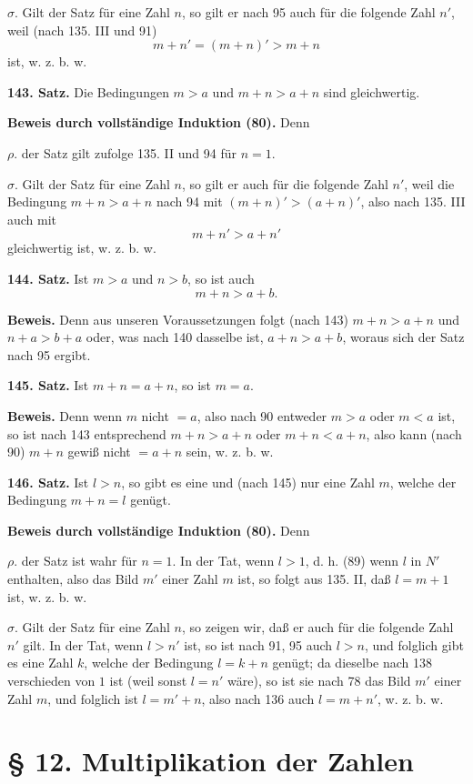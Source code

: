 \documentclass[11pt]{article}
\begin{document}
\noindent $\sigma.$ Gilt der Satz für eine Zahl $n$, so gilt er nach 95 auch für die folgende Zahl $n'$, weil (nach 135. III und 91)
\[
m+n'=(m+n)'>m+n
\]
ist, w. z. b. w.

\noindent\textbf{143. Satz.} Die Bedingungen $m>a$ und $m+n>a+n$ sind gleichwertig.

\noindent\textbf{Beweis durch vollständige Induktion (80).} Denn

\noindent $\rho.$ der Satz gilt zufolge 135. II und 94 für $n=1$.

\noindent $\sigma.$ Gilt der Satz für eine Zahl $n$, so gilt er auch für die folgende Zahl $n'$, weil die Bedingung $m+n>a+n$ nach 94 mit $(m+n)'>(a+n)'$, also nach 135. III auch mit
\[
m+n'>a+n'
\]
gleichwertig ist, w. z. b. w.

\noindent\textbf{144. Satz.} Ist $m>a$ und $n>b$, so ist auch
\[
m+n>a+b.
\]

\noindent\textbf{Beweis.} Denn aus unseren Voraussetzungen folgt (nach 143) $m+n>a+n$ und $n+a>b+a$ oder, was nach 140 dasselbe ist, $a+n>a+b$, woraus sich der Satz nach 95 ergibt.

\noindent\textbf{145. Satz.} Ist $m+n=a+n$, so ist $m=a$.

\noindent\textbf{Beweis.} Denn wenn $m$ nicht $=a$, also nach 90 entweder $m>a$ oder $m<a$ ist, so ist nach 143 entsprechend $m+n>a+n$ oder $m+n<a+n$, also kann (nach 90) $m+n$ gewiß nicht $=a+n$ sein, w. z. b. w.

\noindent\textbf{146. Satz.} Ist $l>n$, so gibt es eine und (nach 145) nur eine Zahl $m$, welche der Bedingung $m+n=l$ genügt.

\noindent\textbf{Beweis durch vollständige Induktion (80).} Denn

\noindent $\rho.$ der Satz ist wahr für $n=1$. In der Tat, wenn $l>1$, d. h. (89) wenn $l$ in $N'$ enthalten, also das Bild $m'$ einer Zahl $m$ ist, so folgt aus 135. II, daß $l=m+1$ ist, w. z. b. w.

\noindent $\sigma.$ Gilt der Satz für eine Zahl $n$, so zeigen wir, daß er auch für die folgende Zahl $n'$ gilt. In der Tat, wenn $l>n'$ ist, so ist nach 91, 95 auch $l>n$, und folglich gibt es eine Zahl $k$, welche der Bedingung $l=k+n$ genügt; da dieselbe nach 138 verschieden von $1$ ist (weil sonst $l=n'$ wäre), so ist sie nach 78 das Bild $m'$ einer Zahl $m$, und folglich ist $l=m'+n$, also nach 136 auch $l=m+n'$, w. z. b. w.

\section*{\S{} 12. Multiplikation der Zahlen}
\end{document}
